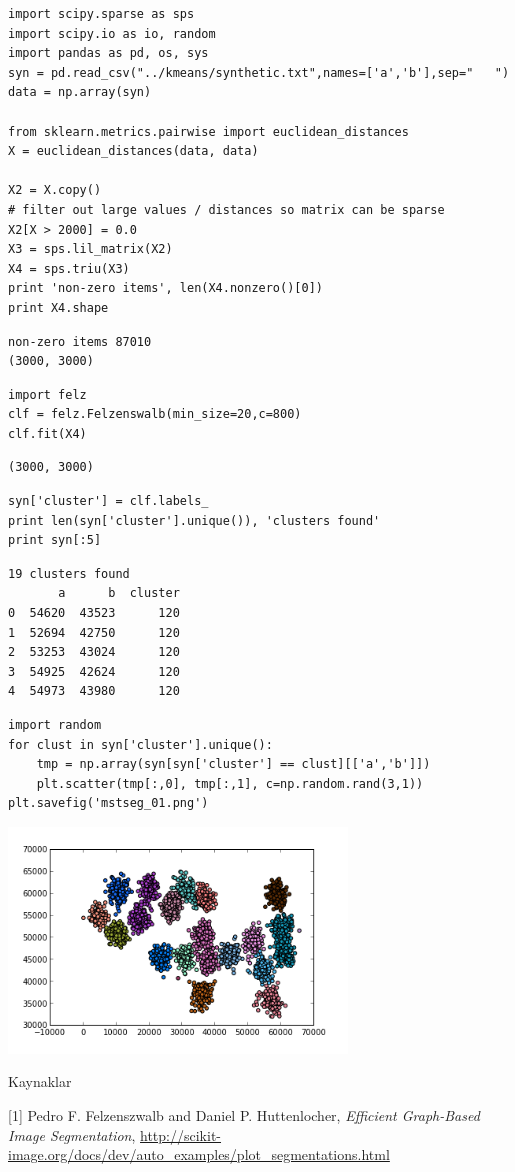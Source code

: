 \documentclass[12pt,fleqn]{article}\usepackage{../common}
\begin{document}
\begin{verbatim}
import scipy.sparse as sps
import scipy.io as io, random
import pandas as pd, os, sys
syn = pd.read_csv("../kmeans/synthetic.txt",names=['a','b'],sep="   ")
data = np.array(syn)

from sklearn.metrics.pairwise import euclidean_distances
X = euclidean_distances(data, data)

X2 = X.copy()
# filter out large values / distances so matrix can be sparse
X2[X > 2000] = 0.0
X3 = sps.lil_matrix(X2)
X4 = sps.triu(X3)
print 'non-zero items', len(X4.nonzero()[0])
print X4.shape
\end{verbatim}

\begin{verbatim}
non-zero items 87010
(3000, 3000)
\end{verbatim}

\begin{verbatim}
import felz
clf = felz.Felzenswalb(min_size=20,c=800)
clf.fit(X4)
\end{verbatim}

\begin{verbatim}
(3000, 3000)
\end{verbatim}

\begin{verbatim}
syn['cluster'] = clf.labels_
print len(syn['cluster'].unique()), 'clusters found'
print syn[:5]
\end{verbatim}

\begin{verbatim}
19 clusters found
       a      b  cluster
0  54620  43523      120
1  52694  42750      120
2  53253  43024      120
3  54925  42624      120
4  54973  43980      120
\end{verbatim}

\begin{verbatim}
import random
for clust in syn['cluster'].unique():
    tmp = np.array(syn[syn['cluster'] == clust][['a','b']])
    plt.scatter(tmp[:,0], tmp[:,1], c=np.random.rand(3,1))
plt.savefig('mstseg_01.png')
\end{verbatim}

\includegraphics[height=6cm]{mstseg_01.png}


Kaynaklar

[1] Pedro F. Felzenszwalb and Daniel P. Huttenlocher, {\em Efficient
  Graph-Based Image Segmentation},
\url{http://scikit-image.org/docs/dev/auto_examples/plot_segmentations.html}
\end{document}
